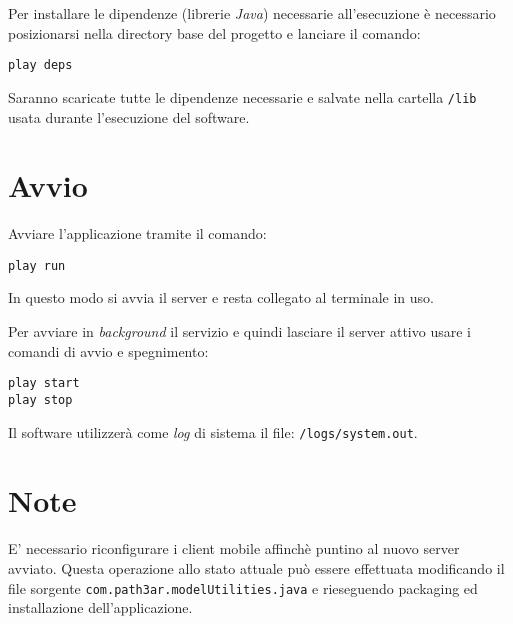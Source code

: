 Per installare le dipendenze (librerie \emph{Java}) necessarie all'esecuzione è necessario posizionarsi nella directory base del progetto e lanciare il comando:
\begin{verbatim}
play deps
\end{verbatim}
Saranno scaricate tutte le dipendenze necessarie e salvate nella cartella \texttt{/lib} usata durante l'esecuzione del software.

\section{Avvio}
Avviare l'applicazione tramite il comando:
\begin{verbatim}
play run
\end{verbatim}
In questo modo si avvia il server e resta collegato al terminale in uso. 

Per avviare in \emph{background} il servizio e quindi lasciare il server attivo usare i comandi di avvio e spegnimento:
\begin{verbatim}
play start
play stop
\end{verbatim}

Il software utilizzerà come \emph{log} di sistema il file: \texttt{/logs/system.out}.

\section{Note}
E' necessario riconfigurare i client mobile affinchè puntino al nuovo server avviato. Questa operazione allo stato attuale può essere effettuata modificando il file sorgente \texttt{com.\-path3ar.\-model\-Utilities.java} e rieseguendo packaging ed installazione dell'applicazione.
